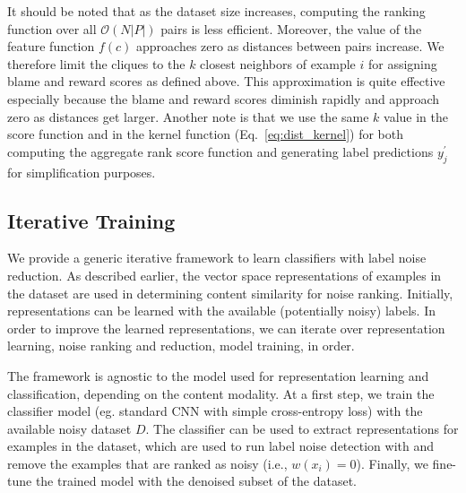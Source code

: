 It should be noted that as the dataset size increases, computing the ranking function over all $\mathcal{O}(N|P|)$ pairs is less efficient. Moreover, the value of the feature function $f(c)$ approaches zero as distances between pairs increase. We therefore limit the cliques to the $k$ closest neighbors of example $i$ for assigning blame and reward scores as defined above. This approximation is quite effective especially because the blame and reward scores diminish rapidly and approach zero as distances get larger. 
Another note is that we use the same $k$ value in the score function and in the kernel function (Eq.~\ref{eq:dist_kernel}) for both computing the aggregate rank score function and generating label predictions $y_j^\prime$ for simplification purposes. 












\subsection{Iterative Training}\label{sec:labelnet_classification}
We provide a generic iterative framework to learn classifiers with label noise reduction. As described earlier, the vector space representations of examples in the dataset are used in determining content similarity for noise ranking. Initially, representations can be learned with the available (potentially noisy) labels. In order to improve the learned representations, we can iterate over representation learning, noise ranking and reduction, model training, in order.

The framework is agnostic to the model used for representation learning and classification, depending on the content modality. At a first step, we train the classifier model (eg. standard CNN with simple cross-entropy loss) with the available noisy dataset $D$. The classifier can be used to extract representations for examples in the dataset, which are used to run label noise detection with \algName and remove the examples that are ranked as noisy (i.e., $w(x_i)=0$). Finally, we fine-tune the trained model with the denoised subset of the dataset. 








